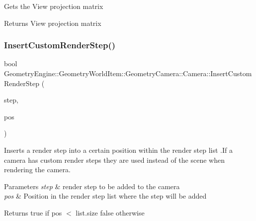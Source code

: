 Gets the View projection matrix \begin{DoxyReturn}{Returns}
View projection matrix 
\end{DoxyReturn}
\mbox{\label{class_geometry_engine_1_1_geometry_world_item_1_1_geometry_camera_1_1_camera_aff83b52805cc8085af8f0802ab554c11}} 
\subsubsection{\texorpdfstring{InsertCustomRenderStep()}{InsertCustomRenderStep()}}
{\footnotesize\ttfamily bool Geometry\+Engine\+::\+Geometry\+World\+Item\+::\+Geometry\+Camera\+::\+Camera\+::\+Insert\+Custom\+Render\+Step (\begin{DoxyParamCaption}\item[{const \mbox{\hyperlink{class_geometry_engine_1_1_geometry_render_step_1_1_render_step}{Geometry\+Render\+Step\+::\+Render\+Step}} \&}]{step,  }\item[{unsigned int}]{pos }\end{DoxyParamCaption})\hspace{0.3cm}{\ttfamily [virtual]}}

Inserts a render step into a certain position within the render step list .If a camera has custom render steps they are used instead of the scene when rendering the camera. 
\begin{DoxyParams}{Parameters}
{\em step} & render step to be added to the camera \\
\hline
{\em pos} & Position in the render step list where the step will be added \\
\hline
\end{DoxyParams}
\begin{DoxyReturn}{Returns}
true if pos $<$ list.\+size false otherwise 
\end{DoxyReturn}
\mbox{\label{class_geometry_engine_1_1_geometry_world_item_1_1_geometry_camera_1_1_camera_a6079f2bacb9134ca0c3d7e8a97993f8c}} 
